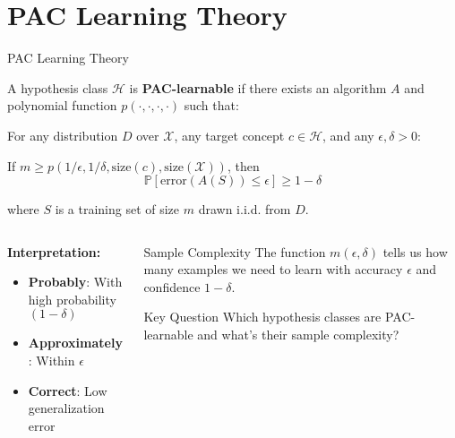 \documentclass[aspectratio=169,11pt]{beamer}
\newcommand{\Prob}{\mathbb{P}}
\begin{document}
\section{PAC Learning Theory}

\begin{frame}{PAC Learning Theory}
\begin{definition}
A hypothesis class $\mathcal{H}$ is \textbf{PAC-learnable} if there exists an algorithm $A$ and polynomial function $p(\cdot, \cdot, \cdot, \cdot)$ such that:

For any distribution $D$ over $\mathcal{X}$, any target concept $c \in \mathcal{H}$, and any $\epsilon, \delta > 0$:

If $m \geq p(1/\epsilon, 1/\delta, \text{size}(c), \text{size}(\mathcal{X}))$, then
\[\Prob[\text{error}(A(S)) \leq \epsilon] \geq 1 - \delta\]

where $S$ is a training set of size $m$ drawn i.i.d. from $D$.
\end{definition}

\begin{columns}
\begin{column}{0.5\textwidth}
\textbf{Interpretation:}
\begin{itemize}
\item \textcolor{forest}{\textbf{Probably}}: With high probability $(1-\delta)$
\item \textcolor{forest}{\textbf{Approximately}}: Within $\epsilon$
\item \textcolor{forest}{\textbf{Correct}}: Low generalization error
\end{itemize}
\end{column}
\begin{column}[t]{0.5\textwidth}
\begin{block}{Sample Complexity}
The function $m(\epsilon, \delta)$ tells us how many examples we need to learn with accuracy $\epsilon$ and confidence $1-\delta$.
\end{block}

\begin{alertblock}{Key Question}
Which hypothesis classes are PAC-learnable and what's their sample complexity?
\end{alertblock}
\end{column}
\end{columns}
\end{frame}
\end{document}
